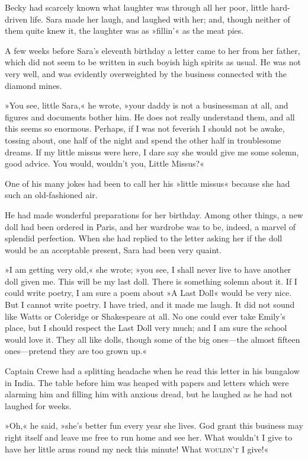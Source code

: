 Becky had scarcely known what laughter was through all her poor, little hard-driven life. Sara made her laugh, and laughed with her; and, though neither of them quite knew it, the laughter was as »fillin'« as the meat pies.

A few weeks before Sara's eleventh birthday a letter came to her from her father, which did not seem to be written in such boyish high spirits as usual. He was not very well, and was evidently overweighted by the business connected with the diamond mines.

»You see, little Sara,« he wrote, »your daddy is not a businessman at all, and figures and documents bother him. He does not really understand them, and all this seems so enormous. Perhaps, if I was not feverish I should not be awake, tossing about, one half of the night and spend the other half in troublesome dreams. If my little missus were here, I dare say she would give me some solemn, good advice. You would, wouldn't you, Little Missus?«

One of his many jokes had been to call her his »little missus« because she had such an old-fashioned air.

He had made wonderful preparations for her birthday. Among other things, a new doll had been ordered in Paris, and her wardrobe was to be, indeed, a marvel of splendid perfection. When she had replied to the letter asking her if the doll would be an acceptable present, Sara had been very quaint.

»I am getting very old,« she wrote; »you see, I shall never live to have another doll given me. This will be my last doll. There is something solemn about it. If I could write poetry, I am sure a poem about »A Last Doll« would be very nice. But I cannot write poetry. I have tried, and it made me laugh. It did not sound like Watts or Coleridge or Shakespeare at all. No one could ever take Emily's place, but I should respect the Last Doll very much; and I am sure the school would love it. They all like dolls, though some of the big ones—the almost fifteen ones—pretend they are too grown up.«

Captain Crewe had a splitting headache when he read this letter in his bungalow in India. The table before him was heaped with papers and letters which were alarming him and filling him with anxious dread, but he laughed as he had not laughed for weeks.

»Oh,« he said, »she's better fun every year she lives. God grant this business may right itself and leave me free to run home and see her. What wouldn't I give to have her little arms round my neck this minute! What \textsc{wouldn't} I give!«

